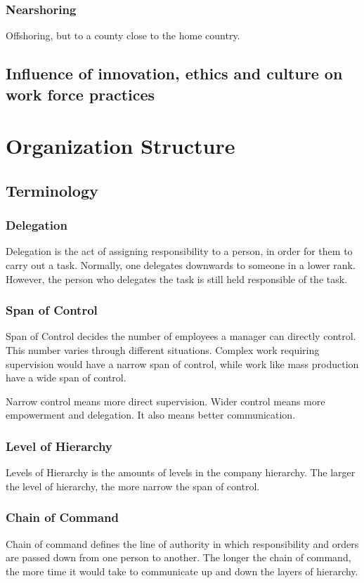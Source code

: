 \documentclass{standalone}
\begin{document}
\subsection{Nearshoring}
Offshoring, but to a county close to the home country.

\section{Influence of innovation, ethics and culture on work force practices}

\chapter{Organization Structure}

\section{Terminology}
\subsection{Delegation}
Delegation is the act of assigning responsibility to a person, in order for them to carry out a task.
Normally, one delegates downwards to someone in a lower rank.
However, the person who delegates the task is still held responsible of the task.

\subsection{Span of Control}
Span of Control decides the number of employees a manager can directly control.
This number varies through different situations.
Complex work requiring supervision would have a narrow span of control, while work like mass production have a wide span of control.

Narrow control means more direct supervision.
Wider control means more empowerment and delegation.
It also means better communication.

\subsection{Level of Hierarchy}
Levels of Hierarchy is the amounts of levels in the company hierarchy.
The larger the level of hierarchy, the more narrow the span of control.

\subsection{Chain of Command}
Chain of command defines the line of authority in which responsibility and orders are passed down from one person to another.
The longer the chain of command, the more time it would take to communicate up and down the layers of hierarchy.
\end{document}

